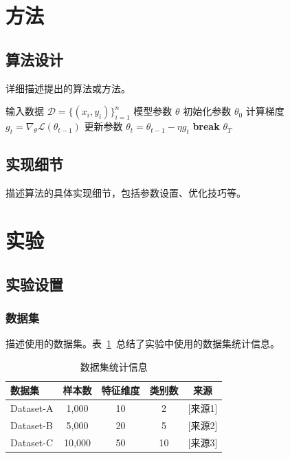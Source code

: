 \documentclass[12pt,a4paper]{article}
\begin{document}
\section{方法}

\subsection{算法设计}

详细描述提出的算法或方法。

\begin{algorithm}[htbp]
\caption{示例算法}
\label{alg:example}
\begin{algorithmic}[1]
\Require 输入数据 $\mathcal{D} = \{(x_i, y_i)\}_{i=1}^n$
\Ensure 模型参数 $\theta$
\State 初始化参数 $\theta_0$
    \State 计算梯度 $g_t = \nabla_\theta \mathcal{L}(\theta_{t-1})$
    \State 更新参数 $\theta_t = \theta_{t-1} - \eta g_t$
        \State \textbf{break}
    \EndIf
\EndFor
\State \Return $\theta_T$
\end{algorithmic}
\end{algorithm}

\subsection{实现细节}

描述算法的具体实现细节，包括参数设置、优化技巧等。

\section{实验}

\subsection{实验设置}

\subsubsection{数据集}

描述使用的数据集。表~\ref{tab:datasets}~总结了实验中使用的数据集统计信息。

\begin{table}[htbp]
    \centering
    \caption{数据集统计信息}
    \label{tab:datasets}
    \begin{tabular}{lcccc}
        \toprule
        \textbf{数据集} & \textbf{样本数} & \textbf{特征维度} & \textbf{类别数} & \textbf{来源} \\
        \midrule
        Dataset-A & 1,000 & 10 & 2 & [来源1] \\
        Dataset-B & 5,000 & 20 & 5 & [来源2] \\
        Dataset-C & 10,000 & 50 & 10 & [来源3] \\
        \bottomrule
    \end{tabular}
\end{table}
\end{document}

